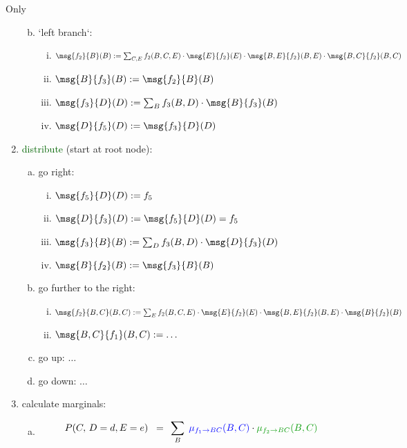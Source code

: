 \begin{frame}{Only}
\begin{enumerate}
\begin{enumerate}[(a)]
\begin{enumerate}[(i)]
  \end{enumerate}
  \item<only@5> `left branch`:
  \begin{enumerate}[(i)]
  \item $\msg{f_{2}}{B}(B) := \sum_{C,E} f_{2}(B,C,E) \cdot \msg{E}{f_{2}}(E) \cdot \msg{B,E}{f_{2}}(B,E) \cdot \msg{B,C}{f_{2}}(B,C)$
  \item $\msg{B}{f_{3}}(B) := \msg{f_{2}}{B}(B)$
  \item $\msg{f_{3}}{D}(D) := \sum_{B} f_{3}(B,D) \cdot \msg{B}{f_{3}}(B)$
  \item $\msg{D}{f_{5}}(D) := \msg{f_{3}}{D}(D)$
  \end{enumerate}
 \end{enumerate}
 \item<only@6->  \textcolor{darkgreen}{distribute} (start at root node):
 \begin{enumerate}[(a)]
  \item<only@7> go right:
  \begin{enumerate}[(i)]
    \item $\msg{f_{5}}{D}(D) := f_{5}$
    \item $\msg{D}{f_{3}}(D) := \msg{f_{5}}{D}(D) = f_{5}$
    \item $\msg{f_{3}}{B}(B) := \sum_{D} f_{3}(B,D) \cdot \msg{D}{f_{3}}(D)$  
    \item $\msg{B}{f_{2}}(B) := \msg{f_{3}}{B}(B)$    
    \end{enumerate}
  \item<only@8-9> go further to the right:
  \begin{enumerate}[(i)]
  \item $\msg{f_{2}}{B,C}(B,C) := \sum_{E} f_{2}(B,C,E) \cdot \msg{E}{f_{2}}(E) \cdot \msg{B,E}{f_{2}}(B,E) \cdot \msg{B}{f_{2}}(B) $
  \item $\msg{B,C}{f_{1}}(B,C) := \ldots$ 
  \end{enumerate}
  \item<only@9> go up: $\ldots$
  \item<only@9> go down: $\ldots$
  \end{enumerate}
  \item<only@10> calculate marginals:
  \begin{enumerate}[(a)]
  \item \begin{align}
					P(C, \,D = d, E = e) 
						\;\; =& \;\; \sum_{B}{} \;
							{\color{blue}\mu_{f_1 \to BC}(B,C)} \cdot 
							{\color{darkgreen} \mu_{f_2 \to BC}(B,C)} 

\end{align}
\end{enumerate}
\end{enumerate}
\end{frame}
